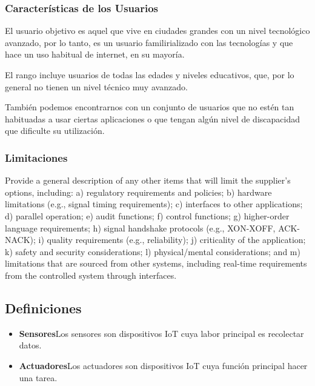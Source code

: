 \documentclass[12pt, a4paper, twoside]{article}
\newcommand\ttab{\tab \hspace{-5cm}}
\begin{document}
 \subsubsection{Características de los Usuarios}
 El usuario objetivo es aquel que vive en ciudades grandes con un nivel tecnológico avanzado,
 por lo tanto, es un usuario familirializado con las tecnologías y que hace un uso
 habitual de internet, en su mayoría.

 El rango incluye usuarios de todas las edades y niveles educativos, que, por lo general
 no tienen un nivel técnico muy avanzado.

 También podemos encontrarnos con un conjunto de usuarios que
 no estén tan habituadas a usar ciertas aplicaciones o que tengan algún nivel de discapacidad
 que dificulte su utilización.


 \subsubsection{Limitaciones}
 Provide a general description of any other items that will limit the supplier's options, including:
 a) regulatory requirements and policies;
 b) hardware limitations (e.g., signal timing requirements);
 c) interfaces to other applications;
 d) parallel operation;
 e) audit functions;
 f) control functions;
 g) higher-order language requirements;
 h) signal handshake protocols (e.g., XON-XOFF, ACK-NACK);
 i) quality requirements (e.g., reliability);
 j) criticality of the application;
 k) safety and security considerations;
 l) physical/mental considerations; and
 m) limitations that are sourced from other systems, including real-time requirements from the
 controlled system through interfaces.

\subsection{Definiciones}
\begin{itemize}
    \item \textbf{Sensores}\ttab Los sensores son dispositivos IoT cuya labor principal es recolectar datos.
    \item \textbf{Actuadores}\ttab Los actuadores son dispositivos IoT cuya función principal hacer una tarea.
\end{itemize}
\end{document}
